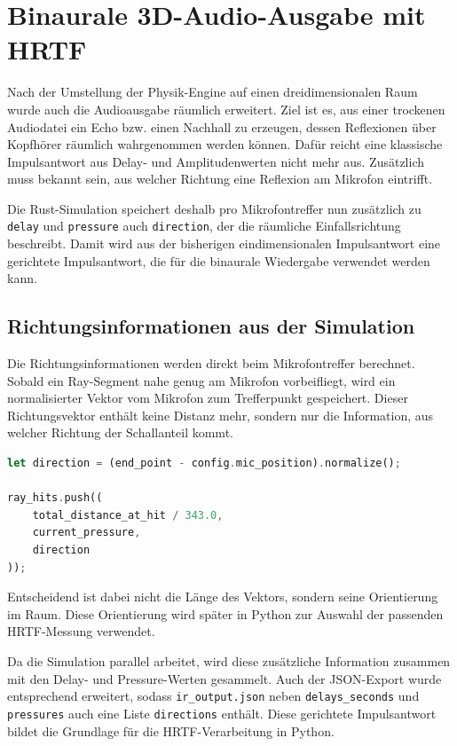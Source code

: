 \section{Binaurale 3D-Audio-Ausgabe mit HRTF}
\label{sec:binaural_3d_audio}

Nach der Umstellung der Physik-Engine auf einen dreidimensionalen Raum wurde auch die Audioausgabe räumlich erweitert. Ziel ist es, aus einer trockenen Audiodatei ein Echo bzw. einen Nachhall zu erzeugen, dessen Reflexionen über Kopfhörer räumlich wahrgenommen werden können. Dafür reicht eine klassische Impulsantwort aus Delay- und Amplitudenwerten nicht mehr aus. Zusätzlich muss bekannt sein, aus welcher Richtung eine Reflexion am Mikrofon eintrifft.

Die Rust-Simulation speichert deshalb pro Mikrofontreffer nun zusätzlich zu \texttt{delay} und \texttt{pressure} auch \texttt{direction}, der die räumliche Einfallsrichtung beschreibt. Damit wird aus der bisherigen eindimensionalen Impulsantwort eine gerichtete Impulsantwort, die für die binaurale Wiedergabe verwendet werden kann.

\subsection{Richtungsinformationen aus der Simulation}
\label{subsec:direction_information}

Die Richtungsinformationen werden direkt beim Mikrofontreffer berechnet. Sobald ein Ray-Segment nahe genug am Mikrofon vorbeifliegt, wird ein normalisierter Vektor vom Mikrofon zum Trefferpunkt gespeichert. Dieser Richtungsvektor enthält keine Distanz mehr, sondern nur die Information, aus welcher Richtung der Schallanteil kommt.

\begin{lstlisting}[language=Rust]
let direction = (end_point - config.mic_position).normalize();

ray_hits.push((
    total_distance_at_hit / 343.0,
    current_pressure,
    direction
));
\end{lstlisting}

Entscheidend ist dabei nicht die Länge des Vektors, sondern seine Orientierung im Raum. Diese Orientierung wird später in Python zur Auswahl der passenden HRTF-Messung verwendet.

Da die Simulation parallel arbeitet, wird diese zusätzliche Information zusammen mit den Delay- und Pressure-Werten gesammelt. Auch der JSON-Export wurde entsprechend erweitert, sodass \texttt{ir\_output.json} neben \texttt{delays\_seconds} und \texttt{pressures} auch eine Liste \texttt{directions} enthält. Diese gerichtete Impulsantwort bildet die Grundlage für die HRTF-Verarbeitung in Python.

